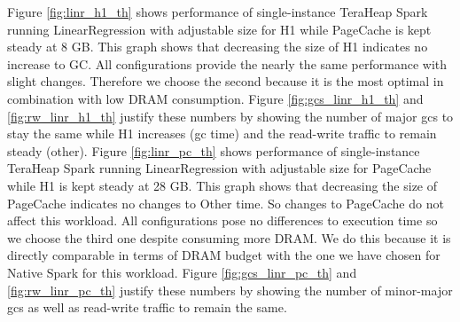 Figure \ref{fig:linr_h1_th} shows performance of
single-instance TeraHeap Spark running LinearRegression with
adjustable size for H1 while PageCache is kept steady at 8 GB. This
graph shows that decreasing the size of H1 indicates no increase to
GC. 
All configurations provide the nearly the same performance with slight changes.
Therefore we choose the second because it is the most optimal in combination with
low DRAM consumption. 
Figure \ref{fig:gcs_linr_h1_th} and \ref{fig:rw_linr_h1_th}
justify these numbers by showing the number of major gcs to stay the
same while H1 increases (gc time) and the read-write traffic to remain
steady (other). 
Figure \ref{fig:linr_pc_th} shows performance of
single-instance TeraHeap Spark running LinearRegression with
adjustable size for PageCache while H1 is kept steady at 28 GB. This
graph shows that decreasing the size of PageCache indicates no changes
to Other time. So changes to PageCache do not affect this workload.
All configurations pose no differences to execution time so we choose the 
third one despite consuming more DRAM. We do this because it is directly comparable
in terms of DRAM budget with the one we have chosen for Native Spark for this workload.
Figure \ref{fig:gcs_linr_pc_th} and \ref{fig:rw_linr_pc_th} justify
these numbers by showing the number of minor-major gcs as well as
read-write traffic to remain the same.

